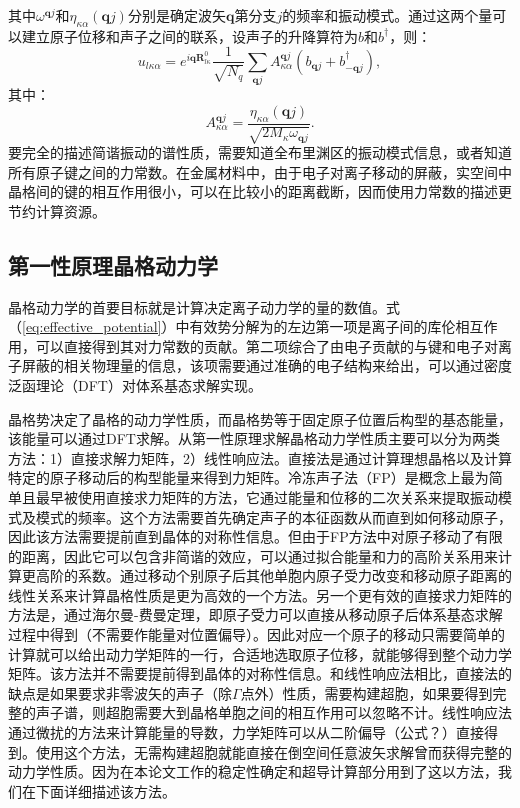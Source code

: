 \documentclass[phd,nobackinfo]{scutthesis}
\begin{document}
其中$\omega^{\bm{q}j}$和$\eta_{\kappa\alpha}(\bm{q}j)$分别是确定波矢$\bm{q}$第分支$j$的频率和振动模式。通过这两个量可以建立原子位移和声子之间的联系，设声子的升降算符为$b$和$b^{\dagger}$，则：
\begin{equation}
  u_{l\kappa\alpha} = e^{i\bm{q}\bm{R}^0_{l\kappa}}\frac{1}{\sqrt{N_q}} \sum_{\bm{q}j} A^{\bm{q}j}_{\kappa\alpha}(b_{\bm{q}j} + b^{\dagger}_{-\bm{q}j}),
\end{equation}
其中：
\begin{equation}
  A^{\bm{q}j}_{\kappa\alpha} = \frac{\eta_{\kappa\alpha}(\bm{q}j)}{\sqrt{2M_\kappa \omega_{\bm{q}j}}}.
\end{equation}
要完全的描述简谐振动的谱性质，需要知道全布里渊区的振动模式信息，或者知道所有原子键之间的力常数。在金属材料中，由于电子对离子移动的屏蔽，实空间中晶格间的键的相互作用很小，可以在比较小的距离截断，因而使用力常数的描述更节约计算资源。

\subsection{第一性原理晶格动力学}
晶格动力学的首要目标就是计算决定离子动力学的量的数值。式（\ref{eq:effective_potential}）中有效势分解为的左边第一项是离子间的库伦相互作用，可以直接得到其对力常数的贡献。第二项综合了由电子贡献的与键和电子对离子屏蔽的相关物理量的信息，该项需要通过准确的电子结构来给出，可以通过密度泛函理论（DFT）对体系基态求解实现。

晶格势决定了晶格的动力学性质，而晶格势等于固定原子位置后构型的基态能量，该能量可以通过DFT求解。从第一性原理求解晶格动力学性质主要可以分为两类方法：1）直接求解力矩阵，2）线性响应法。直接法是通过计算理想晶格以及计算特定的原子移动后的构型能量来得到力矩阵。冷冻声子法（FP）是概念上最为简单且最早被使用直接求力矩阵的方法，它通过能量和位移的二次关系来提取振动模式及模式的频率。这个方法需要首先确定声子的本征函数从而直到如何移动原子，因此该方法需要提前直到晶体的对称性信息。但由于FP方法中对原子移动了有限的距离，因此它可以包含非简谐的效应，可以通过拟合能量和力的高阶关系用来计算更高阶的系数。通过移动个别原子后其他单胞内原子受力改变和移动原子距离的线性关系来计算晶格性质是更为高效的一个方法。另一个更有效的直接求力矩阵的方法是，通过海尔曼-费曼定理，即原子受力可以直接从移动原子后体系基态求解过程中得到（不需要作能量对位置偏导）。因此对应一个原子的移动只需要简单的计算就可以给出动力学矩阵的一行，合适地选取原子位移，就能够得到整个动力学矩阵。该方法并不需要提前得到晶体的对称性信息。和线性响应法相比，直接法的缺点是如果要求非零波矢的声子（除$\Gamma$点外）性质，需要构建超胞，如果要得到完整的声子谱，则超胞需要大到晶格单胞之间的相互作用可以忽略不计。线性响应法通过微扰的方法来计算能量的导数，力学矩阵可以从二阶偏导（公式？）直接得到。使用这个方法，无需构建超胞就能直接在倒空间任意波矢求解曾而获得完整的动力学性质。因为在本论文工作的稳定性确定和超导计算部分用到了这以方法，我们在下面详细描述该方法。
\end{document}

